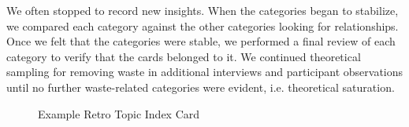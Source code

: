 We often stopped to record new insights. When the categories began to stabilize, we compared each category against the other categories looking for relationships. Once we felt that the categories were stable, we performed a final review of each category to verify that the cards belonged to it. We continued theoretical sampling for removing waste in additional interviews and participant observations until no further waste-related categories were evident, i.e. theoretical saturation. 

\begin{figure}[t]
\centering
{}
\caption{Example Retro Topic Index Card}
\label{exampleRetroTopicl}
\end{figure}














